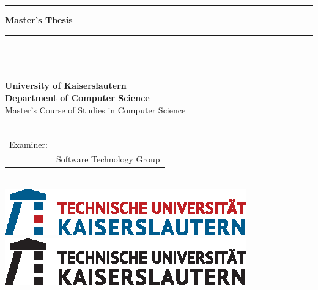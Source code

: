 \hrule
\vspace{0.5cm}
\LARGE \textbf{Master's Thesis}\\
\vspace{0.5cm}
\hrule
\vspace{2.5cm}
\huge \textbf{\textsf{\@title}}\\
\vspace{1.5cm}
\huge \@author\\
\vspace{0.5cm}
\large \href{mailto:\authoremail}{\authoremail}\\
\vspace{1cm}
\large \textbf{University of Kaiserslautern\\Department of Computer Science}\\
\large Master's Course of Studies in Computer Science\\
\vspace{1cm}
\large \@date\\
\vspace{2cm}
\large
\begin{tabular}{rl}
	Examiner: & \primaryexaminer\\
	& Software Technology Group\\
\end{tabular}\\
\vspace{2.5cm}
\ifcolored
	\includegraphics[scale=1.5]{img/TU-KL.eps}
\else
	\includegraphics[scale=1.5]{img/TU-KL-sw.eps}
\fi
